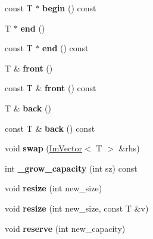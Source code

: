 \begin{DoxyCompactItemize}
const T $\ast$ {\bfseries begin} () const
\item 
\mbox{\label{structImVector_aeb429e7d05b6651dfc716ecdb198dde4}} 
T $\ast$ {\bfseries end} ()
\item 
\mbox{\label{structImVector_a541696299caf4b0477e57b27db70d32c}} 
const T $\ast$ {\bfseries end} () const
\item 
\mbox{\label{structImVector_a34ba855bd3a1ee3e2af215c5ce7d6ddc}} 
T \& {\bfseries front} ()
\item 
\mbox{\label{structImVector_a67e0e856307bbd927e4253461d3772c7}} 
const T \& {\bfseries front} () const
\item 
\mbox{\label{structImVector_a6da15f3c402099ed57078835ab942f8e}} 
T \& {\bfseries back} ()
\item 
\mbox{\label{structImVector_a480aba1c78064ca5370249b38a5ae207}} 
const T \& {\bfseries back} () const
\item 
\mbox{\label{structImVector_afcec0d2a1e28aebe412b6efd06f0a77a}} 
void {\bfseries swap} (\hyperlink{structImVector}{Im\+Vector}$<$ T $>$ \&rhs)
\item 
\mbox{\label{structImVector_a3a097635d464b1b70dc7d59996a88b28}} 
int {\bfseries \+\_\+grow\+\_\+capacity} (int sz) const
\item 
\mbox{\label{structImVector_ac371dd62e56ae486b1a5038cf07eee56}} 
void {\bfseries resize} (int new\+\_\+size)
\item 
\mbox{\label{structImVector_abe7f21776ecfb7d0214963fd8c0689f0}} 
void {\bfseries resize} (int new\+\_\+size, const T \&v)
\item 
\mbox{\label{structImVector_a0f14f5736c3372157856eebb67123b75}} 
void {\bfseries reserve} (int new\+\_\+capacity)
\item 
\mbox{\label{structImVector_aab5df48e0711a48bd12f3206e08c4108}} 

\end{DoxyCompactItemize}
